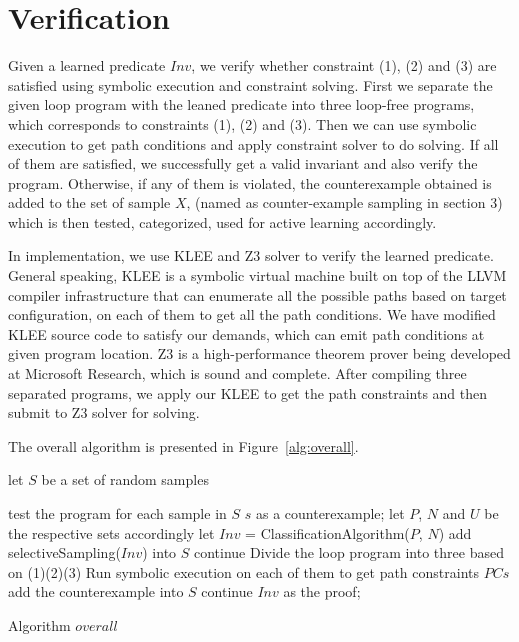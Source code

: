 
\section{Verification} %
\label{sec:verification}

Given a learned predicate $Inv$, we verify whether constraint (1), (2) and (3) are satisfied using symbolic execution and constraint solving.
First we separate the given loop program with the leaned predicate into three loop-free programs,
which corresponds to constraints (1), (2) and (3). 
Then we can use symbolic execution to get path conditions and apply constraint solver to do solving.
If all of them are satisfied, we successfully get a valid invariant and also verify the program. 
Otherwise, if any of them is violated, the counterexample obtained is added to the set of sample $X$, (named as counter-example sampling in section 3)
which is then tested, categorized, used for active learning accordingly.

In implementation, we use KLEE and Z3 solver to verify the learned predicate.
General speaking, KLEE is a symbolic virtual machine built on top of the LLVM compiler infrastructure
that can enumerate all the possible paths based on target configuration, on each of them to get all the path conditions.
We have modified KLEE source code to satisfy our demands, which can emit path conditions at given program location.
Z3 is a high-performance theorem prover being developed at Microsoft Research, which is sound and complete.
After compiling three separated programs, we apply our KLEE to get the path constraints and then submit to Z3 solver for solving.


 
The overall algorithm is presented in Figure~\ref{alg:overall}.
\begin{algorithm}[t]
\SetAlgoVlined
\Indm
{}
\Indp
let $S$ be a set of random samples\;
 {
    test the program for each sample in $S$\;
     {
        \Return $s$ as a counterexample;
    }
    let $P$, $N$ and $U$ be the respective sets accordingly\;
    let $Inv$ = ClassificationAlgorithm($P$, $N$)\;
     {
        add selectiveSampling($Inv$) into $S$\;
        continue\;
    }
    Divide the loop program into three based on (1)(2)(3)\;
    Run symbolic execution on each of them to get path constraints $PCs$\;
     {
         {
            add the counterexample into $S$\;
            continue\;
        }
    }
    \Return $Inv$ as the proof;
    
}
\caption{Algorithm $overall$}
\label{alg:overall}
\end{algorithm}


